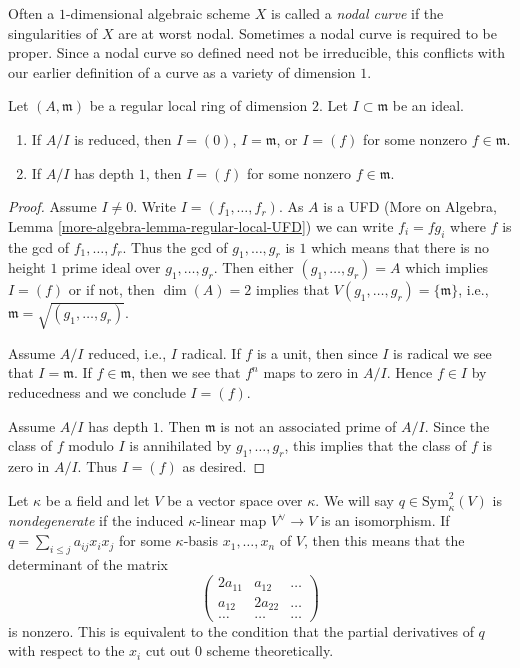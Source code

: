 \noindent
Often a $1$-dimensional algebraic scheme $X$ is called a {\it nodal curve}
if the singularities of $X$ are at worst nodal. Sometimes a nodal curve
is required to be proper. Since a nodal curve
so defined need not be irreducible, this conflicts with our earlier definition
of a curve as a variety of dimension $1$.

\begin{lemma}
\label{lemma-reduced-quotient-regular-ring-dim-2}
Let $(A, \mathfrak m)$ be a regular local ring of dimension $2$.
Let $I \subset \mathfrak m$ be an ideal.
\begin{enumerate}
\item If $A/I$ is reduced, then $I = (0)$, $I = \mathfrak m$, or
$I = (f)$ for some nonzero $f \in \mathfrak m$.
\item If $A/I$ has depth $1$, then $I = (f)$ for some nonzero
$f \in \mathfrak m$. 
\end{enumerate}
\end{lemma}

\begin{proof}
Assume $I \not = 0$. Write $I = (f_1, \ldots, f_r)$. As $A$ is a UFD
(More on Algebra, Lemma \ref{more-algebra-lemma-regular-local-UFD})
we can write $f_i = fg_i$ where $f$ is the gcd of $f_1, \ldots, f_r$.
Thus the gcd of $g_1, \ldots, g_r$ is $1$ which means that
there is no height $1$ prime ideal over $g_1, \ldots, g_r$.
Then either $(g_1, \ldots, g_r) = A$ which implies $I = (f)$ or
if not, then $\dim(A) = 2$ implies that
$V(g_1, \ldots, g_r) = \{\mathfrak m\}$, i.e.,
$\mathfrak m = \sqrt{(g_1, \ldots, g_r)}$.

\medskip\noindent
Assume $A/I$ reduced, i.e., $I$ radical. If $f$ is a unit, then since $I$
is radical we see that $I = \mathfrak m$. If $f \in \mathfrak m$, then we
see that $f^n$ maps to zero in $A/I$. Hence $f \in I$ by reducedness and
we conclude $I = (f)$.

\medskip\noindent
Assume $A/I$ has depth $1$. Then $\mathfrak m$ is not an associated
prime of $A/I$. Since the class of $f$ modulo $I$ is annihilated
by $g_1, \ldots, g_r$, this implies that the class of $f$ is zero
in $A/I$. Thus $I = (f)$ as desired.
\end{proof}

\noindent
Let $\kappa$ be a field and let $V$ be a vector space over $\kappa$.
We will say $q \in \text{Sym}^2_\kappa(V)$ is {\it nondegenerate}
if the induced $\kappa$-linear map $V^\vee \to V$ is an
isomorphism. If $q = \sum_{i \leq j} a_{ij} x_i x_j$ for some
$\kappa$-basis $x_1, \ldots, x_n$ of $V$, then this means that
the determinant of the matrix
$$
\left(
\begin{matrix}
2a_{11} & a_{12} & \ldots \\
a_{12} & 2a_{22} & \ldots \\
\ldots & \ldots & \ldots
\end{matrix}
\right)
$$
is nonzero. This is equivalent to the condition that the
partial derivatives of $q$ with respect to the $x_i$ cut out
$0$ scheme theoretically.

